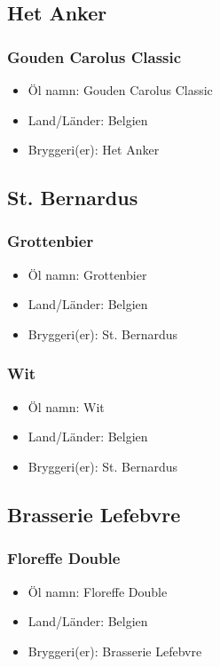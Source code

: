 \documentclass[11pt]{article}
\begin{document}
\subsection{Het Anker}
\label{sec:org7f791dc}
\subsubsection{Gouden Carolus Classic}
\label{sec:org3dccaa7}
\begin{itemize}
\item Öl namn: Gouden Carolus Classic
\item Land/Länder: Belgien
\item Bryggeri(er): Het Anker
\end{itemize}
\subsection{St. Bernardus}
\label{sec:orga6a62cf}
\subsubsection{Grottenbier}
\label{sec:org26e4c0e}
\begin{itemize}
\item Öl namn: Grottenbier
\item Land/Länder: Belgien
\item Bryggeri(er): St. Bernardus
\end{itemize}
\subsubsection{Wit}
\label{sec:orgbb8d6b2}
\begin{itemize}
\item Öl namn: Wit
\item Land/Länder: Belgien
\item Bryggeri(er): St. Bernardus
\end{itemize}
\subsection{Brasserie Lefebvre}
\label{sec:org1a12354}
\subsubsection{Floreffe Double}
\label{sec:orgd1ba6bd}
\begin{itemize}
\item Öl namn: Floreffe Double
\item Land/Länder: Belgien
\item Bryggeri(er): Brasserie Lefebvre
\end{itemize}
\end{document}
